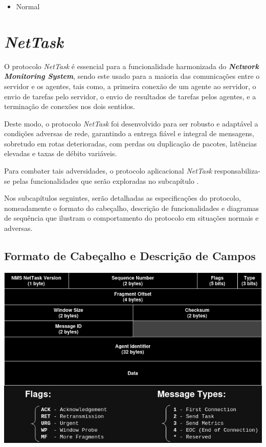 \documentclass[a4paper,12pt]{scrreprt}
\begin{document}
\begin{itemize}
    \item Normal
\end{itemize}

\clearpage

\section{\textit{NetTask}}

O protocolo \textit{NetTask} é essencial para a funcionalidade harmonizada do
\textbf{\textit{Network Monitoring System}}, sendo este usado para a maioria
das comunicações entre o servidor e os agentes, tais como, a primeira conexão de
um agente ao servidor, o envio de tarefas pelo servidor, o envio de resultados
de tarefas pelos agentes, e a terminação de conexões nos dois sentidos.

Deste modo, o protocolo \textit{NetTask} foi desenvolvido para ser robusto e
adaptável a condições adversas de rede, garantindo a entrega fiável e integral
de mensagens, sobretudo em rotas deterioradas, com perdas ou duplicação de pacotes,
latências elevadas e taxas de débito variáveis.

Para combater tais adversidades, o protocolo aplicacional \textit{NetTask}
responsabiliza-se pelas funcionalidades que serão exploradas no subcapítulo
.

Nos subcapítulos seguintes, serão detalhadas as especificações do protocolo,
nomeadamente o formato do cabeçalho, descrição de funcionalidades e diagramas de
sequência que ilustram o comportamento do protocolo em situações normais e adversas.

\subsection{Formato de Cabeçalho e Descrição de Campos}

\begin{minipage}{\textwidth}
    \centering
    \includegraphics[width=\textwidth]{img/nettask_header.png}
    \label{fig:nettask_message_format}
\end{minipage}
\end{document}
